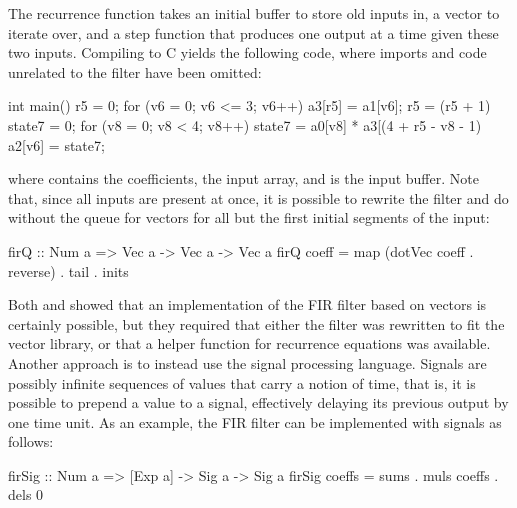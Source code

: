 \documentclass[../paper.tex]{subfiles}
\begin{document}
\noindent The recurrence function takes an initial buffer to store old inputs in, a vector to iterate over, and a step function that produces one output at a time given these two inputs. Compiling  to C yields the following code, where imports and code unrelated to the filter have been omitted:

\begin{code}
int main() {    
  r5 = 0;
  for (v6 = 0; v6 <= 3; v6++) {
    a3[r5] = a1[v6];
    r5 = (r5 + 1) %
    state7 = 0;
    for (v8 = 0; v8 < 4; v8++)
      state7 = a0[v8] * a3[(4 + r5 - v8 - 1) %
    a2[v6] = state7;
  }
}
\end{code}

\noindent where  contains the coefficients,  the input array, and  is the input buffer. Note that, since all inputs are present at once, it is possible to rewrite the filter and do without the queue for vectors for all but the first initial segments of the input:

\begin{code}
firQ :: Num a => Vec a -> Vec a -> Vec a
firQ coeff = map (dotVec coeff . reverse) . tail . inits
\end{code}


Both  and  showed that an implementation of the FIR filter based on vectors is certainly possible, but they required that either the filter was rewritten to fit the vector library, or that a helper function for recurrence equations was available. Another approach is to instead use the signal processing language. Signals are possibly infinite sequences of values that carry a notion of time, that is, it is possible to prepend a value to a signal, effectively delaying its previous output by one time unit. As an example, the FIR filter can be implemented with signals as follows:

\begin{code}
firSig :: Num a => [Exp a] -> Sig a -> Sig a
firSig coeffs = sums . muls coeffs . dels 0
\end{code}
\end{document}

